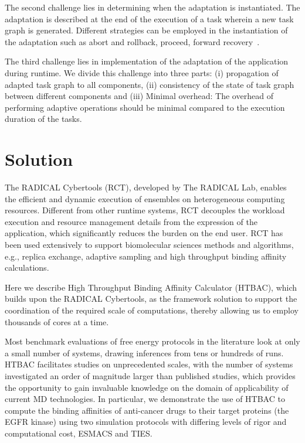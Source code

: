 \documentclass[conference]{IEEEtran}
\begin{document}
The second challenge lies in determining when the adaptation is instantiated. 
The adaptation is described at the end of the execution of a task wherein a new
task graph is generated. Different strategies can be employed in the 
instantiation of the adaptation such as abort and rollback, proceed, forward
recovery~\cite{van2000dealing}.

The third challenge lies in implementation of the adaptation of the application
during runtime. We divide this challenge into three parts: (i) propagation of
adapted task graph to all components, (ii) consistency of the state of task
graph between different components and (iii) Minimal overhead: The overhead of 
performing adaptive operations should be minimal compared to the execution 
duration of the tasks.

\section{Solution}\label{sec:solution}


The RADICAL Cybertools (RCT), developed by The RADICAL Lab, enables the
efficient and dynamic execution of ensembles on heterogeneous computing
resources. Different from other runtime systems, RCT decouples the workload
execution and resource management details from the expression of the
application, which significantly reduces the burden on the end user.
RCT has been used extensively to support
biomolecular sciences methods and algorithms, e.g., replica exchange, adaptive
sampling and high throughput binding affinity calculations.

Here we describe High Throughput Binding Affinity Calculator (HTBAC),
which builds upon the RADICAL Cybertools, as the framework solution to support
the coordination of the required scale of computations, thereby
allowing us to employ thousands of cores at a time.

Most benchmark evaluations of free energy protocols in the literature look
at only a small number of systems, drawing inferences from tens or hundreds
of runs. HTBAC facilitates studies on unprecedented scales, with the number
of systems investigated an order of magnitude larger than published studies,
which provides the opportunity to gain invaluable knowledge on the domain of
applicability of current MD technologies. In particular, we demonstrate the
use of HTBAC to compute the binding affinities of anti-cancer drugs to their
target proteins (the EGFR kinase) using two simulation protocols with differing
levels of rigor and computational cost, ESMACS and TIES.
\end{document}
